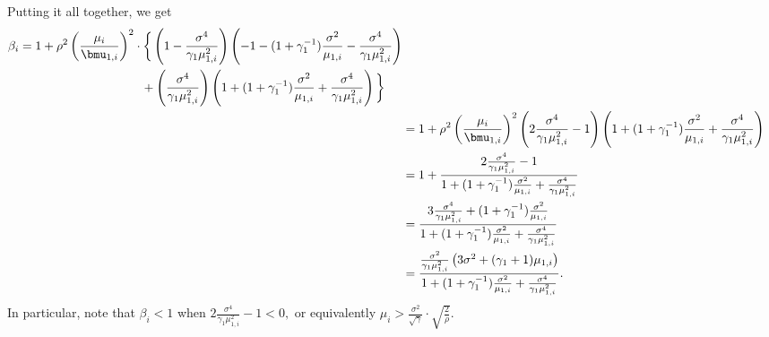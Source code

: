 Putting it all together, we get
\begin{align*}
    \begin{split}
    \beta_i
        &=
            1
            +
            \rho^2
            \left(
                \frac{\mu_i}{\bmu_{1,i}}
            \right)^2 
            \cdot
            \bigg\{
                \left(
                    1
                    -
                    \frac{\sigma^4}{\gamma_1 \mu_{1,i}^2}
                \right)
                \left(
                    -
                    1
                    -
                    (1 + \gamma_1^{-1})
                    \frac{\sigma^2}{\mu_{1,i}}
                    -
                    \frac{\sigma^4}{\gamma_1 \mu_{1,i}^2}
                \right) \\
            &\qquad\qquad\qquad\qquad\qquad+
                \left(
                    \frac{\sigma^4}{\gamma_1 \mu_{1,i}^2}
                \right)
                \left(
                    1
                    +
                    (1 + \gamma_1^{-1})
                    \frac{\sigma^2}{\mu_{1,i}}
                    +
                    \frac{\sigma^4}{\gamma_1 \mu_{1,i}^2}
                \right)
            \bigg\}
    \end{split} \\
    &=
        1
        +
        \rho^2
        \left(
            \frac{\mu_i}{\bmu_{1,i}}
        \right)^2
        \left(
            2
            \frac{\sigma^4}{\gamma_1 \mu_{1,i}^2}
            -
            1
        \right)
        \left(
            1
            +
            (1 + \gamma_1^{-1})
            \frac{\sigma^2}{\mu_{1,i}}
            +
            \frac{\sigma^4}{\gamma_1 \mu_{1,i}^2}
        \right) \\
    &=
        1
        +
        \frac{2 \frac{\sigma^4}{\gamma_1 \mu_{1,i}^2} - 1}
             {
                1
                +
                (1 + \gamma_1^{-1})
                \frac{\sigma^2}{\mu_{1,i}}
                +
                \frac{\sigma^4}{\gamma_1 \mu_{1,i}^2}
             } \\
    &=
        \frac{ 3 \frac{\sigma^4}{\gamma_1 \mu_{1,i}^2} 
               +
               (1 + \gamma_1^{-1})
               \frac{\sigma^2}{\mu_{1,i}}
             }
             {
                1
                +
                (1 + \gamma_1^{-1})
                \frac{\sigma^2}{\mu_{1,i}}
                +
                \frac{\sigma^4}{\gamma_1 \mu_{1,i}^2}
             } \\
    &=
        \frac{
            \frac{\sigma^2}{\gamma_1 \mu_{1,i}^2}
            \left(
                3 \sigma^2
                +
                (\gamma_1 + 1)
                \mu_{1,i}
            \right)
        }
        {
            1
            +
            (1 + \gamma_1^{-1})
            \frac{\sigma^2}{\mu_{1,i}}
            +
            \frac{\sigma^4}{\gamma_1 \mu_{1,i}^2}
        }.
\end{align*}
In particular, note that $\beta_i < 1$ when
\(
    2 \frac{\sigma^4}{\gamma_1 \mu_{1,i}^2} - 1 < 0,
\)
or equivalently
\(
    \mu_i > \frac{\sigma^2}{\sqrt{\gamma}} \cdot \sqrt{\frac{2}{\rho}}.
\)
